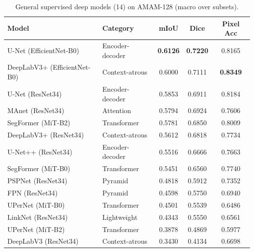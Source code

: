 \documentclass{article}
\newcommand{\datasetname}{AMAM-128}
\newcommand{\tablefontsize}{\small}
\begin{document}
\begin{table}[ht]
    \centering
    \tablefontsize
    \caption{General supervised deep models (14) on \datasetname{} (macro over subsets).}
    \label{tab:deep-general}
    \begin{tabular}{llccc}
        \toprule
        Model & Category & mIoU & Dice & Pixel Acc \\
        \midrule
        U-Net (EfficientNet-B0) & Encoder-decoder & \textbf{0.6126} & \textbf{0.7220} & 0.8165 \\
        DeepLabV3+ (EfficientNet-B0) & Context-atrous & 0.6000 & 0.7111 & \textbf{0.8349} \\
        U-Net (ResNet34) & Encoder-decoder & 0.5853 & 0.6911 & 0.8184 \\
        MAnet (ResNet34) & Attention & 0.5794 & 0.6924 & 0.7606 \\
        SegFormer (MiT-B2) & Transformer & 0.5781 & 0.6850 & 0.8009 \\
        DeepLabV3+ (ResNet34) & Context-atrous & 0.5612 & 0.6818 & 0.7734 \\
        U-Net++ (ResNet34) & Encoder-decoder & 0.5516 & 0.6666 & 0.7663 \\
        SegFormer (MiT-B0) & Transformer & 0.5451 & 0.6560 & 0.7740 \\
        PSPNet (ResNet34) & Pyramid & 0.4818 & 0.5912 & 0.7352 \\
        FPN (ResNet34) & Pyramid & 0.4598 & 0.5750 & 0.6940 \\
        UPerNet (MiT-B0) & Transformer & 0.4501 & 0.5539 & 0.6486 \\
        LinkNet (ResNet34) & Lightweight & 0.4343 & 0.5550 & 0.6561 \\
        UPerNet (MiT-B2) & Transformer & 0.3878 & 0.4869 & 0.5977 \\
        DeepLabV3 (ResNet34) & Context-atrous & 0.3430 & 0.4134 & 0.6698 \\
        \bottomrule
    \end{tabular}
\end{table}
\end{document}
